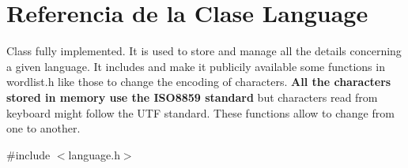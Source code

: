 \hypertarget{classLanguage}{}\section{Referencia de la Clase Language}
\label{classLanguage}


Class fully implemented. It is used to store and manage all the details concerning a given language. It includes and make it publicily available some functions in wordlist.\+h like those to change the encoding of characters. {\bfseries All the characters stored in memory use the I\+S\+O8859 standard} but characters read from keyboard might follow the U\+TF standard. These functions allow to change from one to another.  




{\ttfamily \#include $<$language.\+h$>$}

